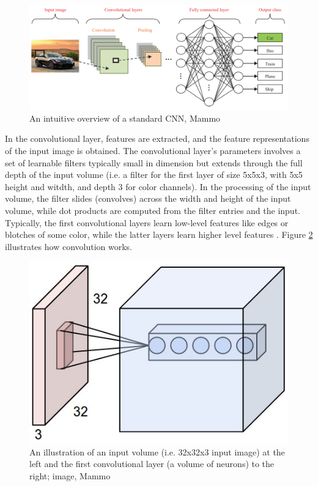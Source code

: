 \begin{figure}[h]
	\centering
  	\includegraphics[scale=1.0]{images/CNN.png}
	 \caption{An intuitive overview of a standard CNN, Mammo}
  	\label{fig:CNN}
\end{figure}

	In the convolutional layer, features are extracted, and the feature representations of the input image is obtained. The convolutional layer's parameters involves a set of learnable filters typically small in dimension but extends through the full depth of the input volume (i.e. a filter for the first layer of size 5x5x3, with 5x5 height and witdth, and depth 3 for color channels). In the processing of the input volume, the filter slides (convolves) across the width and height of the input volume, while dot products are computed from the filter entries and the input. Typically, the first convolutional layers learn low-level features like edges or blotches of some color, while the latter layers learn higher level features \cite{convolutionalLayers}. Figure \ref{fig:convolutionalLayer} illustrates how convolution works. \\

\begin{figure}[h]
	\centering
  	\includegraphics[scale=0.5]{images/convolutionalLayer.jpeg}
	 \caption{An illustration of an input volume (i.e. 32x32x3 input image) at the left and the first convolutional layer (a volume of neurons) to the right; image, Mammo}
  	\label{fig:convolutionalLayer}
\end{figure}

